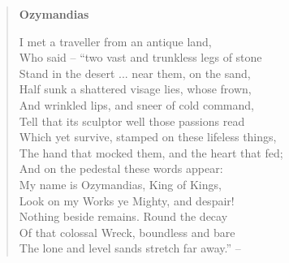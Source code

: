 \blockcquote{shelley:ozymandias}{
	\textbf{Ozymandias}\medskip

	I met a traveller from an antique land, \\
	Who said -- ``two vast and trunkless legs of stone \\
	Stand in the desert ... near them, on the sand, \\
	Half sunk a shattered visage lies, whose frown, \\
	And wrinkled lips, and sneer of cold command, \\
	Tell that its sculptor well those passions read \\
	Which yet survive, stamped on these lifeless things, \\
	The hand that mocked them, and the heart that fed; \\
	And on the pedestal these words appear: \\
	My name is Ozymandias, King of Kings, \\
	Look on my Works ye Mighty, and despair! \\
	Nothing beside remains. Round the decay \\
	Of that colossal Wreck, boundless and bare \\
	The lone and level sands stretch far away.'' -- \medskip \\
}

\medskip


